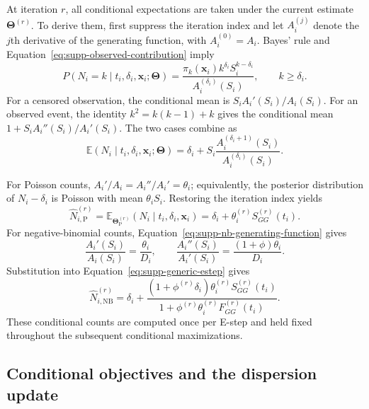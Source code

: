 \documentclass[11pt]{article}
\begin{document}
At iteration $r$, all conditional expectations are taken under the current estimate $\bm\Theta^{(r)}$. To derive them, first suppress the iteration index and let $A_i^{(j)}$ denote the $j$th derivative of the generating function, with $A_i^{(0)}=A_i$. Bayes' rule and Equation~\eqref{eq:supp-observed-contribution} imply
\begin{equation}
P(N_i=k\mid t_i,\delta_i,\bm{x}_i;\bm\Theta)
=\frac{\pi_k(\bm{x}_i)k^{\delta_i}S_i^{k-\delta_i}}
{A_i^{(\delta_i)}(S_i)},
\qquad k\geq\delta_i.
\label{eq:supp-count-posterior}
\end{equation}
For a censored observation, the conditional mean is $S_iA_i'(S_i)/A_i(S_i)$. For an observed event, the identity $k^2=k(k-1)+k$ gives the conditional mean $1+S_iA_i''(S_i)/A_i'(S_i)$. The two cases combine as
\begin{equation}
\mathbb E(N_i\mid t_i,\delta_i,\bm{x}_i;\bm\Theta)
=\delta_i+S_i
\frac{A_i^{(\delta_i+1)}(S_i)}
{A_i^{(\delta_i)}(S_i)}.
\label{eq:supp-generic-estep}
\end{equation}

For Poisson counts, $A_i'/A_i=A_i''/A_i'=\theta_i$; equivalently, the posterior distribution of $N_i-\delta_i$ is Poisson with mean $\theta_iS_i$. Restoring the iteration index yields
\begin{equation}
\widehat N_{i,\mathrm P}^{(r)}
=\mathbb E_{\bm\Theta_{\mathrm P}^{(r)}}
(N_i\mid t_i,\delta_i,\bm{x}_i)
=\delta_i+\theta_i^{(r)}S_{GG}^{(r)}(t_i).
\label{eq:supp-poisson-estep}
\end{equation}
For negative-binomial counts, Equation~\eqref{eq:supp-nb-generating-function} gives
\begin{equation}
\frac{A_i'(S_i)}{A_i(S_i)}=\frac{\theta_i}{D_i},
\qquad
\frac{A_i''(S_i)}{A_i'(S_i)}
=\frac{(1+\phi)\theta_i}{D_i}.
\end{equation}
Substitution into Equation~\eqref{eq:supp-generic-estep} gives
\begin{equation}
\widehat N_{i,\mathrm{NB}}^{(r)}
=\delta_i+
\frac{(1+\phi^{(r)}\delta_i)\theta_i^{(r)}S_{GG}^{(r)}(t_i)}
{1+\phi^{(r)}\theta_i^{(r)}F_{GG}^{(r)}(t_i)}.
\label{eq:supp-nb-estep}
\end{equation}
These conditional counts are computed once per E-step and held fixed throughout the subsequent conditional maximizations.

\subsection{Conditional objectives and the dispersion update}
\end{document}

